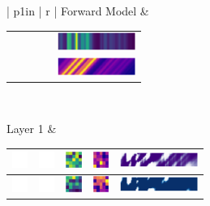 \documentclass[landscape,paperwidth=46truein,paperheight=41truein,fontscale=0.3]{baposter}
\begin{document}
\begin{poster}
{\begin{center}
\begin{minipage}{0.98 \columnwidth}
\begin{multicols}{3}
\begin{center}
{\begin{tabular}{| p{1in} | r |}
 				 Forward Model
 				 &
			 	\begin{tabular}{c c c c | c}
					& & & & \includegraphics[width=1in]{../../../../src/python/minnd/model_plt/img_1_2_0_0}\\
					& & & &\includegraphics[width=1in]{../../../../src/python/minnd/model_plt/img_1_2_1_0}
 				 \end{tabular} \\ \hline
				 				 
				 Layer 1
				 &
				\begin{tabular}{c c c c | c}
					\includegraphics[height=0.2in]{../../../../src/python/minnd/model_plt/img_w} &
					\includegraphics[height=0.2in]{../../../../src/python/minnd/model_plt/img_w} &
					\includegraphics[height=0.2in]{../../../../src/python/minnd/model_plt/img_2_1_0_0} &
					\includegraphics[height=0.2in]{../../../../src/python/minnd/model_plt/img_2_1_0_1} & \includegraphics[width=1in]{../../../../src/python/minnd/model_plt/img_2_2_0_0} \\ \hline
					\includegraphics[height=0.2in]{../../../../src/python/minnd/model_plt/img_w} &
					\includegraphics[height=0.2in]{../../../../src/python/minnd/model_plt/img_w} &
					\includegraphics[height=0.2in]{../../../../src/python/minnd/model_plt/img_2_1_1_0} &
					\includegraphics[height=0.2in]{../../../../src/python/minnd/model_plt/img_2_1_1_1} & \includegraphics[width=1in]{../../../../src/python/minnd/model_plt/img_2_2_1_0} \\ \hline

\end{tabular}
\end{tabular}}
\end{center}
\end{multicols}
\end{minipage}
\end{center}}
\end{poster}
\end{document}
